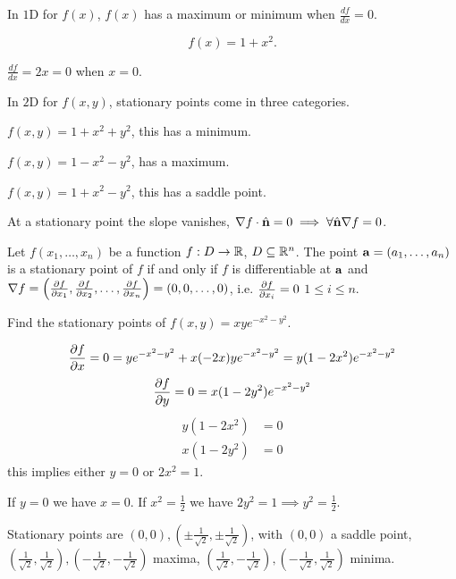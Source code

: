 \documentclass[10pt, a4paper]{article}
\begin{document}
In $1$D for $f(x)$,
$f(x)$ has a maximum or minimum when $\frac{df}{dx} = 0$.
\begin{example}
    \[
    f(x) = 1 + x ^ 2.
    \]
    
    \begin{solution}
        $\frac{df}{dx} = 2x = 0$ when $x = 0$.
    \end{solution}
\end{example}

In $2$D for $f(x, y)$,
stationary points come in three categories.

\begin{example}
    $f(x, y) = 1 + x ^ 2 + y ^ 2$,
    this has a minimum.

    $f(x, y) = 1 - x ^ 2 - y ^ 2$,
    has a maximum.

    $f(x, y) = 1 + x ^ 2 - y ^ 2$,
    this has a saddle point.
\end{example}

At a stationary point the slope vanishes,
$\nabla f \cdot \hat{\mbf{n}} = 0 \implies \forall \hat{\mbf{n}} \nabla f = 0$.

\begin{definition}
    Let $f(x_1, \dotsc, x_n)$ be a function $f : D \rightarrow \R$,
    $D \subseteq \R ^ n$.
    The point $\mbf{a} = (a_1, \dotsc, a_n)$ is a stationary point of $f$ if and only if $f$ is differentiable at $\mbf{a}$ and $\nabla f = \left(\pd[f]{x_1}, \pd[f]{x_2}, \dotsc, \pd[f]{x_n}\right) = (0, 0, \dotsc, 0)$,
    i.e. $\pd[f]{x_i} = 0$ $1 \leq i \leq n$.
\end{definition}

\begin{example}
    Find the stationary points of $f(x, y) = xye ^ {-x ^ 2 - y ^ 2}$.

    \begin{solution}
        \[
        \pd[f]{x} = 0 = ye ^ {-x ^ 2 - y ^ 2} + x(-2x)ye ^ {-x ^ 2 - y ^ 2} = y(1 - 2x ^ 2)e ^ {-x ^ 2 - y ^ 2}
        \]
        \[
        \pd[f]{y} = 0 = x(1 - 2y ^ 2)e ^ {-x ^ 2 - y ^ 2}
        \]
        \begin{align*}
            y(1 - 2x ^ 2) &= 0 \\
            x(1 - 2y ^ 2) &= 0
        \end{align*}
        this implies either $y = 0$ or $2x ^ 2 = 1$.

        If $y = 0$ we have $x = 0$.
        If $x ^ 2 = \frac{1}{2}$ we have $2y ^ 2 = 1 \implies y ^ 2 = \frac{1}{2}$.

        Stationary points are $(0, 0), \left(\pm\frac{1}{\sqrt{2}}, \pm\frac{1}{\sqrt{2}}\right)$,
        with $(0, 0)$ a saddle point,
        $\left(\frac{1}{\sqrt{2}}, \frac{1}{\sqrt{2}}\right), \left(-\frac{1}{\sqrt{2}}, -\frac{1}{\sqrt{2}}\right)$ maxima,
        $\left(\frac{1}{\sqrt{2}}, -\frac{1}{\sqrt{2}}\right), \left(-\frac{1}{\sqrt{2}}, \frac{1}{\sqrt{2}}\right)$ minima.
    \end{solution}
\end{example}
\end{document}
